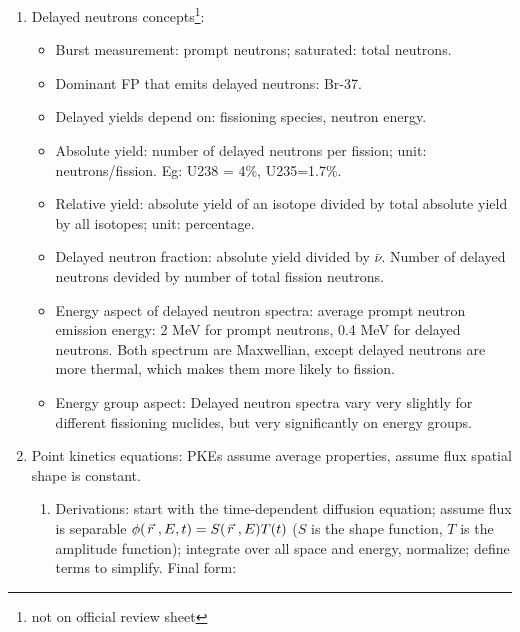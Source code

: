 \documentclass{school-22.211-notes}
\date{May 22, 2012}
\begin{document}
\maketitle


\clearpage
{}
\begin{enumerate}
\item Delayed neutrons concepts\footnote{not on official review sheet}: 
  \begin{itemize}
  \item Burst measurement: prompt neutrons; saturated: total neutrons. 
  \item Dominant FP that emits delayed neutrons: Br-37. 
  \item Delayed yields depend on: fissioning species, neutron energy.  
  \item Absolute yield: number of delayed neutrons per fission; unit: neutrons/fission. Eg: U238 = 4\%, U235=1.7\%. 
  \item Relative yield: absolute yield of an isotope divided by total absolute yield by all isotopes; unit: percentage. 
  \item Delayed neutron fraction: absolute yield divided by $\bar{\nu}$. Number of delayed neutrons devided by number of total fission neutrons. 
  \item Energy aspect of delayed neutron spectra: average prompt neutron emission energy: 2 MeV for prompt neutrons, 0.4 MeV for delayed neutrons. Both spectrum are Maxwellian, except delayed neutrons are more thermal, which makes them more likely to fission. 
  \item Energy group aspect: Delayed neutron spectra vary very slightly for different fissioning nuclides, but very significantly on energy groups. 
  \end{itemize}


\item Point kinetics equations: PKEs assume average properties, assume flux spatial shape is constant. 
  \begin{enumerate}
  \item Derivations: start with the time-dependent diffusion equation; assume flux is separable $\phi(\left.\vec{r}\right., E, t) = S(\left.\vec{r}\right., E) T(t)$ ($S$ is the shape function, $T$ is the amplitude function); integrate over all space and energy, normalize; define terms to simplify. Final form: 


\end{enumerate}
\end{enumerate}
\end{document}
